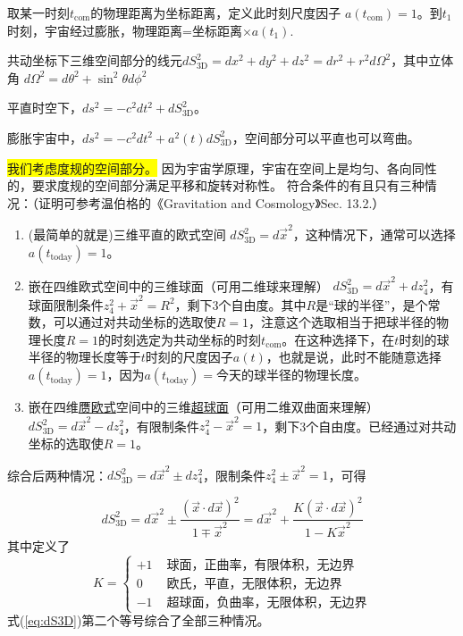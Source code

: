 \documentclass[]{ctexart}
\begin{document}
取某一时刻$t_\text{com}$的物理距离为坐标距离，定义此时刻尺度因子
\newline $a(t_\text{com})=1$。到$t_1$时刻，宇宙经过膨胀，物理距离=坐标距离$\times a(t_1)$.

共动坐标下三维空间部分的线元$dS_\text{3D}^2 = dx^2+dy^2+dz^2=dr^2+r^2 d\Omega^2$，其中立体角 $d\Omega^2 = d\theta^2 + \sin^2\theta d\phi^2$ 

平直时空下，$ds^2=-c^2dt^2 + dS_\text{3D}^2$。

膨胀宇宙中，$ds^2=-c^2dt^2 + a^2(t) dS_\text{3D}^2$，空间部分可以平直也可以弯曲。

\colorbox{yellow}{我们考虑度规的空间部分。}
因为宇宙学原理，宇宙在空间上是均匀、各向同性的，要求度规的空间部分满足平移和旋转对称性。
符合条件的有且只有三种情况：（证明可参考温伯格的《Gravitation and Cosmology》Sec. 13.2.）
\begin{enumerate}
    \item (最简单的就是)三维平直的欧式空间 $dS_\text{3D}^2 = d\vec{x}^2$，这种情况下，通常可以选择$a(t_\text{today})=1$。
    \item 嵌在四维欧式空间中的三维球面（可用二维球来理解） $dS_\text{3D}^2 = d\vec{x}^2 + dz_4^2$，有球面限制条件$z_4^2 + \vec{x}^2 = R^2$，剩下3个自由度。其中$R$是“球的半径”，是个常数，可以通过对共动坐标的选取使$R=1$，注意这个选取相当于把球半径的物理长度$R=1$的时刻选定为共动坐标的时刻$t_\text{com}$。在这种选择下，在$t$时刻的球半径的物理长度等于$t$时刻的尺度因子$a(t)$，也就是说，此时不能随意选择$a(t_\text{today})=1$，因为$a(t_\text{today})=$今天的球半径的物理长度。
    \item 嵌在四维\underline{赝欧式}空间中的三维\underline{超球面}（可用二维双曲面来理解） \\ $dS_\text{3D}^2 = d\vec{x}^2 - dz_4^2$，有限制条件$z_4^2 - \vec{x}^2 = 1$，剩下3个自由度。已经通过对共动坐标的选取使$R=1$。
\end{enumerate}

综合后两种情况：$dS_\text{3D}^2 = d\vec{x}^2 \pm dz_4^2$，限制条件$z_4^2 \pm \vec{x}^2 = 1$，可得

\begin{equation} \label{eq:dS3D}
    dS_\text{3D}^2 = d\vec{x}^2 \pm \frac{(\vec{x} \cdot d\vec{x})^2}{1\mp \vec{x}^2} = d\vec{x}^2 +  \frac{K(\vec{x} \cdot d\vec{x})^2}{1-K \vec{x}^2}
\end{equation}
其中定义了
\begin{equation}
    K= \begin{cases}+1 & \text { 球面，正曲率，有限体积，无边界} \\ 0 & \text { 欧氏，平直，无限体积，无边界 } \\ -1 & \text { 超球面，负曲率，无限体积，无边界} \end{cases}
\end{equation}
式(\ref{eq:dS3D})第二个等号综合了全部三种情况。
\end{document}
